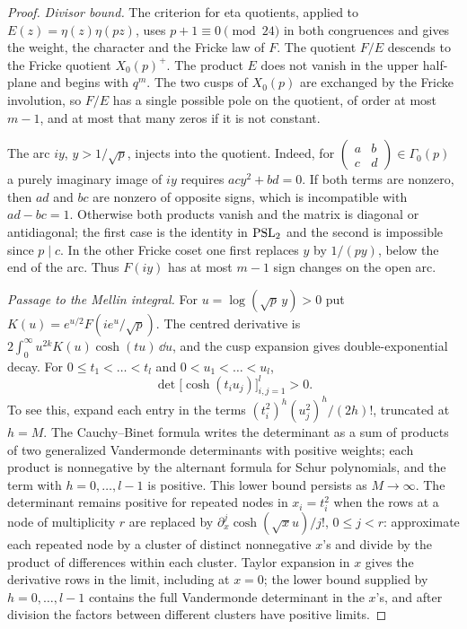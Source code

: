 \begin{proof}
\emph{Divisor bound.}
The criterion for eta quotients, applied to $E(z)=\eta(z)\eta(pz)$, uses $p+1\equiv0\pmod{24}$ in both
congruences and gives the weight, the character and the Fricke law of $F$. The quotient $F/E$ descends to
the Fricke quotient $X_0(p)^+$. The product $E$ does not vanish in the upper half-plane and begins with
$q^m$. The two cusps of $X_0(p)$ are exchanged by the Fricke involution, so $F/E$ has a single possible
pole on the quotient, of order at most $m-1$, and at most that many zeros if it is not constant.

The arc $iy$, $y>1/\sqrt p$, injects into the quotient. Indeed, for
$\left(\begin{smallmatrix}a&b\\c&d\end{smallmatrix}\right)\in\Gamma_0(p)$ a purely imaginary image of $iy$
requires $acy^2+bd=0$. If both terms are nonzero, then $ad$ and $bc$ are nonzero of opposite signs, which
is incompatible with $ad-bc=1$. Otherwise both products vanish and the matrix is diagonal or antidiagonal;
the first case is the identity in $\operatorname{PSL}_2$ and the second is impossible since $p\mid c$. In the other
Fricke coset one first replaces $y$ by $1/(py)$, below the end of the arc. Thus $F(iy)$ has at most $m-1$
sign changes on the open arc.

\emph{Passage to the Mellin integral.}
For $u=\log(\sqrt p\,y)>0$ put $K(u)=e^{u/2}F(ie^u/\sqrt p)$. The centred derivative is
$2\int_0^\infty u^{2k}K(u)\cosh(tu)\,\dd u$, and the cusp expansion gives double-exponential decay. For
$0\le t_1<\dots<t_l$ and $0<u_1<\dots<u_l$,
\[
 \det\bigl[\cosh(t_iu_j)\bigr]_{i,j=1}^l>0 .
\]
To see this, expand each entry in the terms $(t_i^2)^h(u_j^2)^h/(2h)!$, truncated at $h=M$. The
Cauchy--Binet formula writes the determinant as a sum of products of two generalized Vandermonde
determinants with positive weights; each product is nonnegative by the alternant formula for Schur
polynomials, and the term with $h=0,\dots,l-1$ is positive. This lower bound persists as $M\to\infty$. The
determinant remains positive for repeated nodes in $x_i=t_i^2$ when the rows at a node of multiplicity $r$
are replaced by $\partial_x^j\cosh(\sqrt xu)/j!$, $0\le j<r$: approximate each repeated node by a cluster
of distinct nonnegative $x$'s and divide by the product of differences within each cluster. Taylor
expansion in $x$ gives the derivative rows in the limit, including at $x=0$; the lower bound supplied by
$h=0,\dots,l-1$ contains the full Vandermonde determinant in the $x$'s, and after division the factors
between different clusters have positive limits.


\end{proof}
